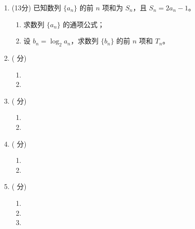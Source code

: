 \documentclass[12pt,a4paper]{article}
\begin{document}
	\begin{enumerate}[resume]
		\item (13分) 已知数列 \( \{a_n\} \) 的前 \( n \) 项和为 \( S_n \)，且 \( S_n = 2a_n - 1 \)。
		\begin{enumerate}
			\item 求数列 \( \{a_n\} \) 的通项公式；
			\item 设 \( b_n = \log_2 a_n \)，求数列 \( \{b_n\} \) 的前 \( n \) 项和 \( T_n \)。
		\end{enumerate}



		\item (  分)
		\begin{enumerate}
			\item
			\item
		\end{enumerate}



		\item ( 分)
		\begin{enumerate}
			\item
			\item
		\end{enumerate}



		\item ( 分)
		\begin{enumerate}
			\item
			\item
		\end{enumerate}



		\item ( 分)
		\begin{enumerate}
			\item
			\item
			\item
		\end{enumerate}


	\end{enumerate}
\end{document}
